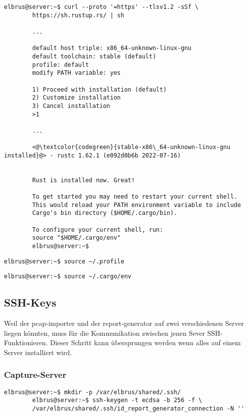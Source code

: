 \documentclass{article}
\begin{document}
	\lstset{style=commands}
	\begin{lstlisting}[caption={Installieren von Rust.}]
		elbrus@server:~$ curl --proto '=https' --tlsv1.2 -sSf \
		https://sh.rustup.rs/ | sh
		 
		...
		 
		default host triple: x86_64-unknown-linux-gnu
		default toolchain: stable (default)
		profile: default
		modify PATH variable: yes
		
		1) Proceed with installation (default)
		2) Customize installation
		3) Cancel installation
		>1
		
		...
		
		<@\textcolor{codegreen}{stable-x86\_64-unknown-linux-gnu installed}@> - rustc 1.62.1 (e092d0b6b 2022-07-16)
		
		
		Rust is installed now. Great!
		
		To get started you may need to restart your current shell.
		This would reload your PATH environment variable to include
		Cargo's bin directory ($HOME/.cargo/bin).
		
		To configure your current shell, run:
		source "$HOME/.cargo/env"
		elbrus@server:~$
	\end{lstlisting}
	
	\begin{lstlisting}[caption={Laden der Variablen aus dem Terminal Profil.}]
		elbrus@server:~$ source ~/.profile
	\end{lstlisting}

	\begin{lstlisting}[caption={Hinzufügen des Befehls Cargo zu dem Pfad.}]
		elbrus@server:~$ source ~/.cargo/env
	\end{lstlisting}

	\newpage
	\subsection{SSH-Keys}
	
	Weil der pcap-importer und der report-generator auf zwei verschiedenen Server liegen könnten, muss für die Kommunikation zwischen jenen Sever SSH-Funktionieren.
	\newline\newline
	Dieser Schritt kann übersprungen werden wenn alles auf einem Server installiert wird.
	
	\subsubsection{Capture-Server}
	\begin{lstlisting}[caption={Anlegen der SSH-Keys.}]
		elbrus@server:~$ mkdir -p /var/elbrus/shared/.ssh/
		elbrus@server:~$ ssh-keygen -t ecdsa -b 256 -f \
		/var/elbrus/shared/.ssh/id_report_generator_connection -N ''
	\end{lstlisting}
	
\end{document}
